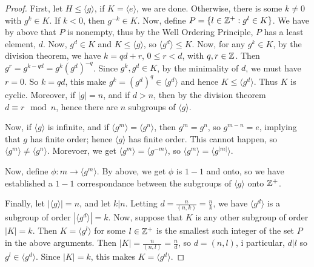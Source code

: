 \begin{proof}
  First, let $H \leq \langle g \rangle$, if $K=\langle e \rangle$, we are done.
  Otherwise, there is some $k \neq 0$ with  $g^k \in K$. If  $k<0$, then
  $g^{-k} \in K$. Now, define $P=\{l \in \mathbb{Z}^+ : g^l \in K\}$. We have by above
  that $P$ is nonempty, thus by the Well Ordering Principle,  $P$ has a
  least element, $d$. Now,  $g^d \in K$ and  $K \leq \langle g \rangle$, so
  $\langle g^d \rangle \leq K$. Now, for any $g^k \in K$, by the division
  theorem, we have  $k=qd+r$, $0 \leq r < d$, with  $q, r \in \mathbb{Z}$. Then
  $g^r=g^{k-qd}=g^k(g^d)^{-q}$. Since $g^k,g^d \in K$, by the minimality of
  $d$, we must have  $r=0$. So $k=qd$, this make $g^k=(g^d)^q \in
  \langle g^d \rangle$ and hence $K \leq \langle g^d \rangle$. Thus $K$ is
  cyclic. Moreover, if $|g|=n$, and if $d>n$, then by the division theorem
  $d \equiv r \mod{n}$, hence there are  $n$ subgroups of $\langle g
  \rangle$.

  Now, if $\langle g \rangle$ is infinite, and if $\langle g^m
  \rangle=\langle g^n \rangle$, then $g^m=g^n$, so $g^{m-n}=e$, implying that
  $g$ has finite order; hence $\langle g \rangle$ has finite order. This cannot
  happen, so  $\langle g^m \rangle \neq \langle g^n \rangle$. Morevoer, we get
  $\langle g^m \rangle=\langle g^{-m} \rangle$, so $\langle g^m
  \rangle=\langle g^{|m|} \rangle$.

  Now, define $\phi:m \rightarrow \langle g^m \rangle$. By above, we get $\phi$
  is $1-1$ and onto, so we have established  a  $1-1$ correspondance between
  the subgroups of  $\langle g \rangle$ onto $\mathbb{Z}^+$.

  Finally, let $|\langle g \rangle|=n$, and let $k|n$. Letting
  $d=\frac{n}{(n,k)}=\frac{n}{k}$, we have $\langle g^d \rangle$ is a
  subgroup of order $|\langle g^d \rangle|=k$. Now, suppose that $K$
  is any other subgroup of order  $|K|=k$. Then $K=\langle g^l
  \rangle$ for some $l \in \mathbb{Z}^+$ is the smallest such integer of the
  set $P$ in the above arguments. Then
  $|K|=\frac{n}{(n,l)}=\frac{n}{d}$, so $d=(n,l)$, i particular, $d|l$
  so  $g^l \in \langle g^d \rangle$. Since $|K|=k$, this makes
  $K=\langle g^d \rangle$.
\end{proof}

